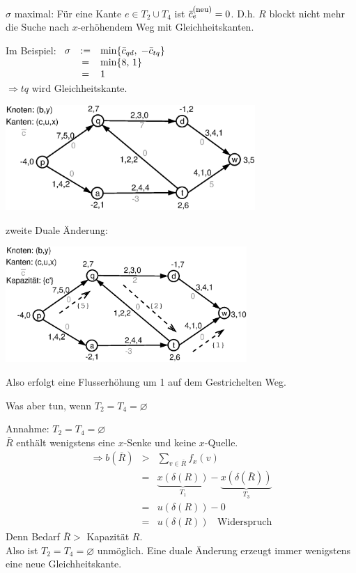 $\sigma$ maximal: Für eine Kante $e\in T_{2} \cup T_{4}$ ist
$\bar{c}_{e}^{\mbox{\footnotesize (neu)}}  = 0$. D.h. $R$ blockt nicht mehr die Suche nach
$x$-erhöhendem Weg mit Gleichheitskanten.

Im Beispiel: $\begin{array}[t]{rcl}\sigma &:=& \min \{\bar{c}_{q d}, \; -\bar{c}_{t q}
\}\\ &=& \min \{8,\, 1\}\\ &=& 1\end{array}$\\
$\Rightarrow t q$ wird Gleichheitskante. 

\includegraphics[height=4cm]{bilder/4-3PDMinKostFL2}

zweite Duale Änderung:

\includegraphics[height=4.4cm]{bilder/4-3PDMinKostFL3}

Also erfolgt eine Flusserhöhung um 1 auf dem Gestrichelten Weg.

Was aber tun, wenn $T_{2}=T_{4} = \varnothing$

Annahme:  $T_{2}=T_{4} = \varnothing$\\
$\bar{R}$ enthält wenigstens eine $x$-Senke und keine $x$-Quelle.\\
\[\begin{array}{rcl}
\Rightarrow b(\bar{R}) &>& \displaystyle \sum_{v \in \bar{R}} f_{x}(v)\\
&=& \underbrace{x(\delta(R))}_{T_{1}} -
\underbrace{x(\delta(\bar{R}))}_{T_{3}}\\
&=& u(\delta(R)) - 0\\
&=& u(\delta(R)) \; \; \mbox{ Widerspruch}
\end{array}\]
Denn Bedarf $\bar{R} >$ Kapazität $R$.\\
Also ist $T_{2} = T_{4} = \varnothing$ unmöglich. Eine duale Änderung
erzeugt immer wenigstens eine neue Gleichheitskante.

